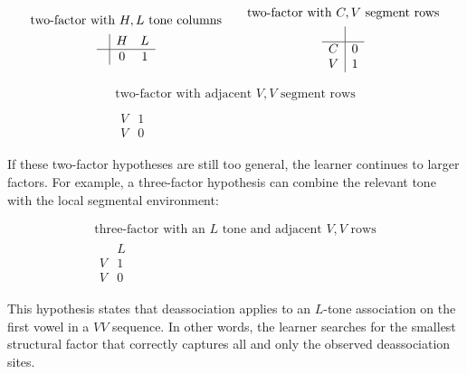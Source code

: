 \documentclass{article}[12pt]
\begin{document}
\[
\begin{array}{cc}
\begin{array}{c}
\text{two-factor with } H,L \text{ tone columns}
\\[1ex]
\begin{array}{c|cc}
 & H & L \\
\hline
 & 0 & 1
\end{array}
\end{array}
&
\begin{array}{c}
\text{two-factor with } C,V \text{ segment rows}
\\[1ex]
\begin{array}{c|c}
 &  \\
\hline
C & 0 \\
V & 1
\end{array}
\end{array}
\end{array}
\]

\[
\begin{array}{c}
\text{two-factor with adjacent } V,V \text{ segment rows}
\\[1ex]
\begin{array}{c|c}
 &  \\
\hline
V & 1 \\
V & 0
\end{array}
\end{array}
\]

If these two-factor hypotheses are still too general, the learner
continues to larger factors. For example, a three-factor hypothesis can
combine the relevant tone with the local segmental environment:

\[
\begin{array}{c}
\text{three-factor with an } L \text{ tone and adjacent } V,V \text{ rows}
\\[1ex]
\begin{array}{c|c}
 & L \\
\hline
V & 1 \\
V & 0
\end{array}
\end{array}
\]

This hypothesis states that deassociation applies to an \(L\)-tone
association on the first vowel in a \(V V\) sequence. In other words,
the learner searches for the smallest structural factor that correctly
captures all and only the observed deassociation sites.

\vfill

\footnotesize

\end{document}
